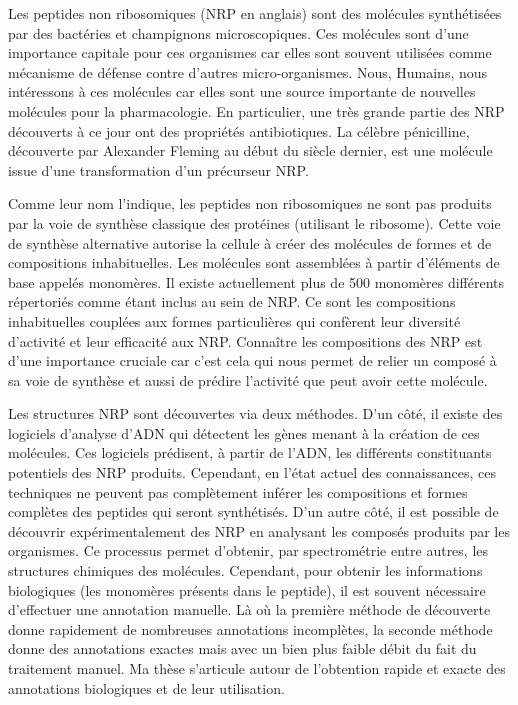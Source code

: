 Les peptides non ribosomiques (NRP en anglais) sont des molécules synthétisées par des bactéries et champignons microscopiques.
Ces molécules sont d'une importance capitale pour ces organismes car elles sont souvent utilisées comme mécanisme de défense contre d'autres micro-organismes.
Nous, Humains, nous intéressons à ces molécules car elles sont une source importante de nouvelles molécules pour la pharmacologie.
En particulier, une très grande partie des NRP découverts à ce jour ont des propriétés antibiotiques.
La célèbre pénicilline, découverte par Alexander Fleming au début du siècle dernier, est une molécule issue d'une transformation d'un précurseur NRP.

Comme leur nom l'indique, les peptides non ribosomiques ne sont pas produits par la voie de synthèse classique des protéines (utilisant le ribosome).
Cette voie de synthèse alternative autorise la cellule à créer des molécules de formes et de compositions inhabituelles.
Les molécules sont assemblées à partir d'éléments de base appelés monomères.
Il existe actuellement plus de 500 monomères différents répertoriés comme étant inclus au sein de NRP.
Ce sont les compositions inhabituelles couplées aux formes particulières qui confèrent leur diversité d'activité et leur efficacité aux NRP.
Connaître les compositions des NRP est d'une importance cruciale car c'est cela qui nous permet de relier un composé à sa voie de synthèse et aussi de prédire l'activité que peut avoir cette molécule.

Les structures NRP sont découvertes via deux méthodes.
D'un côté, il existe des logiciels d'analyse d'ADN qui détectent les gènes menant à la création de ces molécules.
Ces logiciels prédisent, à partir de l'ADN, les différents constituants potentiels des NRP produits.
Cependant, en l'état actuel des connaissances, ces techniques ne peuvent pas complètement inférer les compositions et formes complètes des peptides qui seront synthétisés.
D'un autre côté, il est possible de découvrir expérimentalement des NRP en analysant les composés produits par les organismes.
Ce processus permet d'obtenir, par spectrométrie entre autres, les structures chimiques des molécules.
Cependant, pour obtenir les informations biologiques (les monomères présents dans le peptide), il est souvent nécessaire d'effectuer une annotation manuelle.
Là où la première méthode de découverte donne rapidement de nombreuses annotations incomplètes, la seconde méthode donne des annotations exactes mais avec un bien plus faible débit du fait du traitement manuel.
Ma thèse s'articule autour de l'obtention rapide et exacte des annotations biologiques et de leur utilisation.

